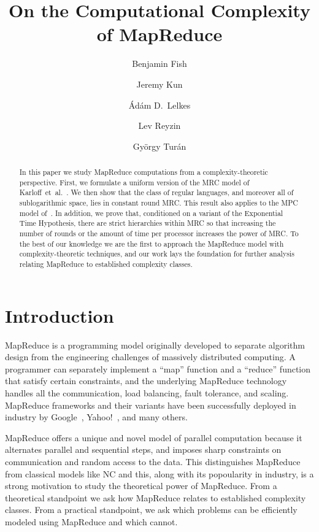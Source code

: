 \documentclass[11pt]{article}
\title{On the Computational Complexity of MapReduce
}
\date{}
\author{Benjamin Fish}
\author{Jeremy Kun}
\author{\'Ad\'am D.\ Lelkes}
\author{Lev Reyzin}
\author{Gy\"orgy Tur\'an}
\affil{
Department of Mathematics, Statistics, and Computer Science\\
University of Illinois at Chicago\\
Chicago, IL 60607\\
\texttt{\{bfish3,jkun2,alelke2,lreyzin,gyt\}@uic.edu}
}
\theoremstyle{definition}
\theoremstyle{remark}
\begin{document}
\maketitle

\begin{abstract} In this paper we study MapReduce computations from a
complexity-theoretic perspective. First, we formulate a uniform version of
the MRC model of Karloff~et~al.~\cite{Karloff10}. We then show that the class
of regular languages, and moreover all of sublogarithmic space, lies in
constant round MRC. This result also applies to the MPC model
of~\cite{AndoniNOY14}. In addition, we prove that, conditioned on a variant of
the Exponential Time Hypothesis, there are strict hierarchies within MRC so
that increasing the number of rounds or the amount of time per processor
increases the power of MRC. To the best of our knowledge we are the first to
approach the MapReduce model with complexity-theoretic techniques, and our work
lays the foundation for further analysis relating MapReduce to established
complexity classes. \end{abstract}

\section{Introduction}

MapReduce is a programming model originally developed to separate algorithm
design from the engineering challenges of massively distributed computing. A
programmer can separately implement a ``map'' function and a ``reduce''
function that satisfy certain constraints, and the underlying MapReduce
technology handles all the communication, load balancing, fault tolerance, and
scaling. MapReduce frameworks and their variants have been successfully
deployed in industry by Google~\cite{DeanG08}, Yahoo!~\cite{ShvachkoKRC10}, and
many others.

MapReduce offers a unique and novel model of parallel computation because it
alternates parallel and sequential steps, and imposes sharp constraints on
communication and random access to the data. This distinguishes MapReduce from
classical models like NC and this, along with its popoularity in industry, is a
strong motivation to study the theoretical power of MapReduce. From a
theoretical standpoint we ask how MapReduce relates to established complexity
classes. From a practical standpoint, we ask which problems can be efficiently
modeled using MapReduce and which cannot.
\end{document}
